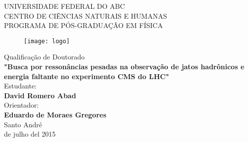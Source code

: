 \begin{titlepage}

\noindent  UNIVERSIDADE FEDERAL DO ABC \\
\noindent  CENTRO DE CIÊNCIAS NATURAIS E HUMANAS\\
\noindent  PROGRAMA DE PÓS-GRADUAÇÃO EM  FÍSICA\\


\begin{figure}[htb]
\begin{center}
\texttt{[image: logo]}
\end{center}
\end{figure}



\begin{center}
\noindent \Large Qualificação de Doutorado\\
\vspace*{0.5cm}
\noindent \Large \textbf{"Busca por ressonâncias pesadas na observação de jatos hadrônicos e energia faltante no experimento CMS do LHC"}\\
\vspace*{0.5cm}
\noindent   Estudante: \\
\vspace*{0.5cm}
\noindent \Large \textbf{David Romero Abad} \\
\vspace*{0.5cm}
\noindent  Orientador:   \\
\vspace*{0.5cm}
\noindent \Large  \textbf{Eduardo de Moraes Gregores}\\
\vspace*{0.5cm}
\noindent   Santo André \\
\vspace*{0.5cm}
 de julho del 2015 \\
\end{center}
\end{titlepage}
\titlepage

\newpage
$\ $
\thispagestyle{empty}
